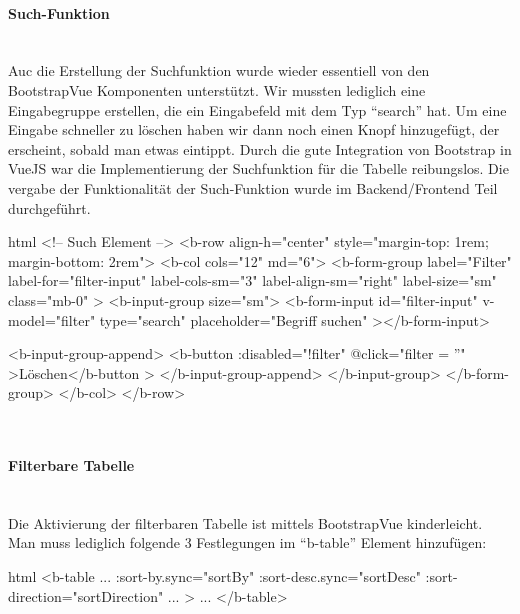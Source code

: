 \paragraph{Such-Funktion}
~\\
Auc die Erstellung der Suchfunktion wurde wieder essentiell von den BootstrapVue Komponenten unterstützt. Wir mussten lediglich eine Eingabegruppe erstellen, die ein Eingabefeld mit dem Typ \enquote{search} hat. Um eine Eingabe schneller zu löschen haben wir dann noch einen Knopf hinzugefügt, der erscheint, sobald man etwas eintippt. Durch die gute Integration von Bootstrap in VueJS war die Implementierung der Suchfunktion für die Tabelle reibungslos. Die vergabe der Funktionalität der Such-Funktion wurde im Backend/Frontend Teil durchgeführt.
\begin{code}{html}
	<!-- Such Element -->
    <b-row align-h="center" style="margin-top: 1rem; margin-bottom: 2rem">
      <b-col cols="12" md="6">
        <b-form-group
          label="Filter"
          label-for="filter-input"
          label-cols-sm="3"
          label-align-sm="right"
          label-size="sm"
          class="mb-0"
        >
          <b-input-group size="sm">
            <b-form-input
              id="filter-input"
              v-model="filter"
              type="search"
              placeholder="Begriff suchen"
            ></b-form-input>

            <b-input-group-append>
              <b-button :disabled="!filter" @click="filter = ''"
                >Löschen</b-button
              >
            </b-input-group-append>
          </b-input-group>
        </b-form-group>
      </b-col>
    </b-row>
\end{code}
	\label{list:antragsearchcode} ~\\
\paragraph{Filterbare Tabelle}
~\\
Die Aktivierung der filterbaren Tabelle ist mittels BootstrapVue kinderleicht. Man muss lediglich folgende 3 Festlegungen im \enquote{b-table} Element hinzufügen:
\begin{code}{html}
	<b-table
		...
		:sort-by.sync="sortBy"
      	:sort-desc.sync="sortDesc"
      	:sort-direction="sortDirection"
		...
	>
	...
	</b-table>
\end{code}
	\label{list:antragfiltercode} ~\\
